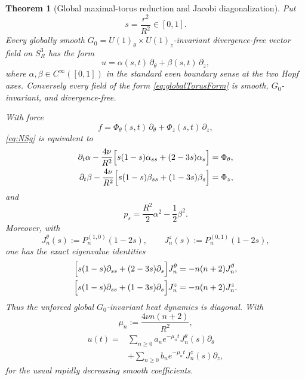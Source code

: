 \documentclass[aps,prd,reprint,superscriptaddress,nofootinbib,floatfix]{revtex4-2}
\newtheorem{theorem}{Theorem}
\theoremstyle{definition}
\theoremstyle{remark}
\begin{document}
\begin{theorem}[Global maximal-torus reduction and Jacobi diagonalization]\label{thm:globaltorus}
	Put
	\begin{equation}
		s=\frac{r^2}{R^2}\in[0,1].
	\end{equation}
	Every globally smooth $G_0=U(1)_\theta\times U(1)_z$-invariant divergence-free vector field on $S^3_R$ has the form
	\begin{equation}
		u=\alpha(s,t)\,\partial_\theta+\beta(s,t)\,\partial_z ,
		\label{eq:globalTorusForm}
	\end{equation}
	where $\alpha,\beta\in C^\infty([0,1])$ in the standard even boundary sense at the two Hopf axes.  Conversely every field of the form \eqref{eq:globalTorusForm} is smooth, $G_0$-invariant, and divergence-free.

	With force
	\[
		f=\Phi_\theta(s,t)\,\partial_\theta+\Phi_z(s,t)\,\partial_z,
	\]
	\eqref{eq:NSg} is equivalent to
	\begin{align}
		\partial_t\alpha-\frac{4\nu}{R^2}
		\Bigl[s(1-s)\alpha_{ss}+(2-3s)\alpha_s\Bigr] & =\Phi_\theta,
		\label{eq:alphaJacobiHeat}                                   \\
		\partial_t\beta-\frac{4\nu}{R^2}
		\Bigl[s(1-s)\beta_{ss}+(1-3s)\beta_s\Bigr]   & =\Phi_z,
		\label{eq:betaJacobiHeat}
	\end{align}
	and
	\begin{equation}
		p_s=\frac{R^2}{2}\alpha^2-\frac12\beta^2 .
		\label{eq:globalTorusPressure}
	\end{equation}
	Moreover, with
	\begin{equation}
		J_n^\theta(s):=P_n^{(1,0)}(1-2s),\qquad
		J_n^z(s):=P_n^{(0,1)}(1-2s),
	\end{equation}
	one has the exact eigenvalue identities
	\begin{align}
		\Bigl[s(1-s)\partial_{ss}+(2-3s)\partial_s\Bigr]J_n^\theta
		 & =-n(n+2)J_n^\theta, \\
		\Bigl[s(1-s)\partial_{ss}+(1-3s)\partial_s\Bigr]J_n^z
		 & =-n(n+2)J_n^z .
	\end{align}
	Thus the unforced global $G_0$-invariant heat dynamics is diagonal.  With
	\[
		\mu_n:=\frac{4\nu n(n+2)}{R^2},
	\]
	\begin{equation}
		\begin{aligned}
			u(t)={} & \sum_{n\ge0}a_n e^{-\mu_n t}J_n^\theta(s)\partial_\theta \\
			        & +\sum_{n\ge0}b_n e^{-\mu_n t}J_n^z(s)\partial_z ,
		\end{aligned}
		\label{eq:JacobiExactSolution}
	\end{equation}
	for the usual rapidly decreasing smooth coefficients.
\end{theorem}
\end{document}
